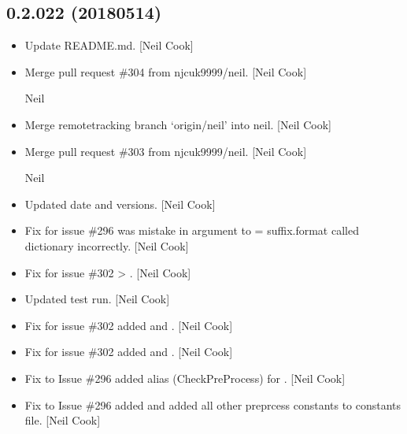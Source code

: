 \documentclass[a4paper,10pt,english]{report}
\begin{document}
\subsection{0.2.022 (2018\sphinxhyphen{}05\sphinxhyphen{}14)}
\label{\detokenize{misc/changelog:id457}}\begin{itemize}
\item {} 
Update README.md. {[}Neil Cook{]}

\item {} 
Merge pull request \#304 from njcuk9999/neil. {[}Neil Cook{]}

Neil

\item {} 
Merge remote\sphinxhyphen{}tracking branch ‘origin/neil’ into neil. {[}Neil Cook{]}

\item {} 
Merge pull request \#303 from njcuk9999/neil. {[}Neil Cook{]}

Neil

\item {} 
Updated date and versions. {[}Neil Cook{]}

\item {} 
Fix for issue \#296 \sphinxhyphen{} was mistake in argument to  =
suffix.format  \sphinxhyphen{} called dictionary incorrectly. {[}Neil Cook{]}

\item {} 
Fix for issue \#302 \sphinxhyphen{}  \textendash{}\textgreater{} . {[}Neil Cook{]}

\item {} 
Updated test run. {[}Neil Cook{]}

\item {} 
Fix for issue \#302 \sphinxhyphen{} added  and . {[}Neil
Cook{]}

\item {} 
Fix for issue \#302 \sphinxhyphen{} added  and . {[}Neil
Cook{]}

\item {} 
Fix to Issue \#296 \sphinxhyphen{} added alias (CheckPreProcess) for
. {[}Neil Cook{]}

\item {} 
Fix to Issue \#296 \sphinxhyphen{} added  and added all other
preprcess constants to constants file. {[}Neil Cook{]}


\end{itemize}
\end{document}
